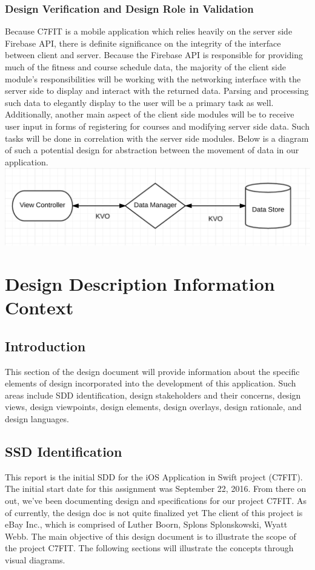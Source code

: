\documentclass[letterpaper,10pt,titlepage]{article}
\begin{document}
\subsubsection{Design Verification and Design Role in Validation}
Because C7FIT is a mobile application which relies heavily on the server side Firebase API, there is definite significance on the integrity of the interface between client and server. Because the Firebase API is responsible for providing much of the fitness and course schedule data, the majority of the client side module's responsibilities will be working with the networking interface with the server side to display and interact with the returned data. Parsing and processing such data to elegantly display to the user will be a primary task as well. Additionally, another main aspect of the client side modules will be to receive user input in forms of registering for courses and modifying server side data. Such tasks will be done in correlation with the server side modules. Below is a diagram of such a potential design for abstraction between the movement of data in our application. \\

\includegraphics[width=\textwidth]{dataflow.png}

\section{Design Description Information Context}

\subsection{Introduction}
This section of the design document will provide information about the specific elements of design incorporated into the development of this application. Such areas include SDD identification, design stakeholders and their concerns, design views, design viewpoints, design elements, design overlays, design rationale, and design languages.

\subsection{SSD Identification}
This report is the initial SDD for the iOS Application in Swift project (C7FIT). The initial start date for this assignment was September 22, 2016. From there on out, we've been documenting design and specifications for our project C7FIT. As of currently, the design doc is not quite finalized yet The client of this project is eBay Inc., which is comprised of Luther Boorn, Splons Splonskowski, Wyatt Webb. The main objective of this design document is to illustrate the scope of the project C7FIT. The following sections will illustrate the concepts through visual diagrams.
\end{document}
